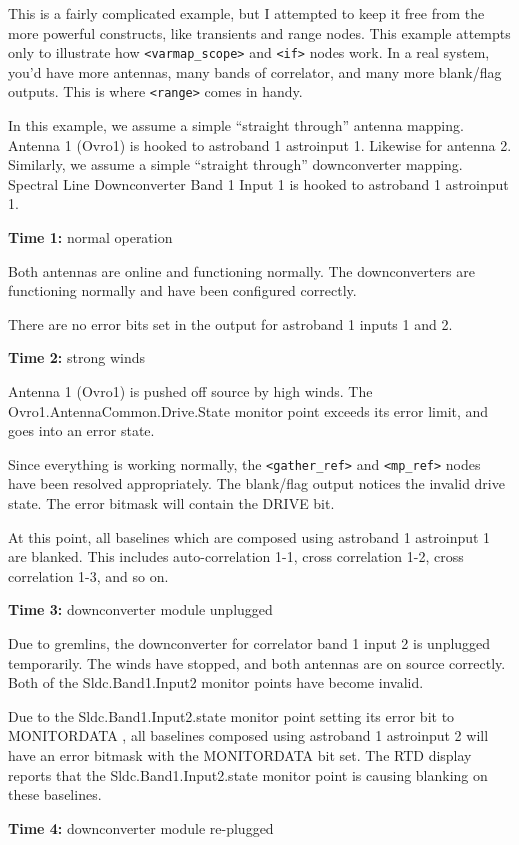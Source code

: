 \documentclass[letterpaper,12pt,oneside,pdftex]{article}
\newcommand{\mytime}[2]{\textbf{Time #1:} #2}
\begin{document}
This is a fairly complicated example, but I attempted to keep it free from the
more powerful constructs, like transients and range nodes. This example attempts
only to illustrate how \verb|<varmap_scope>| and \verb|<if>| nodes work. In a
real system, you'd have more antennas, many bands of correlator, and many more
blank/flag outputs. This is where \verb|<range>| comes in handy.

In this example, we assume a simple ``straight through'' antenna mapping.
Antenna 1 (Ovro1) is hooked to astroband 1 astroinput 1. Likewise for antenna 2.
Similarly, we assume a simple ``straight through'' downconverter mapping.
Spectral Line Downconverter Band 1 Input 1 is hooked to astroband 1 astroinput
1.

\mytime{1}{normal operation}

Both antennas are online and functioning normally. The downconverters are
functioning normally and have been configured correctly.

There are no error bits set in the output for astroband 1 inputs 1 and 2.

\mytime{2}{strong winds}

Antenna 1 (Ovro1) is pushed off source by high winds. The
Ovro1.AntennaCommon.Drive.State monitor point exceeds its error limit, and goes
into an error state.

Since everything is working normally, the \verb|<gather_ref>| and
\verb|<mp_ref>| nodes have been resolved appropriately. The blank/flag output
notices the invalid drive state. The error bitmask will contain the DRIVE bit.

At this point, all baselines which are composed using astroband 1 astroinput 1
are blanked. This includes auto-correlation 1-1, cross correlation 1-2, cross
correlation 1-3, and so on.

\mytime{3}{downconverter module unplugged}

Due to gremlins, the downconverter for correlator band 1 input 2 is unplugged
temporarily. The winds have stopped, and both antennas are on source correctly.
Both of the Sldc.Band1.Input2 monitor points have become invalid.

Due to the Sldc.Band1.Input2.state monitor point setting its error bit to
MONITORDATA , all baselines composed using astroband 1 astroinput 2 will have an
error bitmask with the MONITORDATA bit set. The RTD display reports that the
Sldc.Band1.Input2.state monitor point is causing blanking on these baselines.

\mytime{4}{downconverter module re-plugged}
\end{document}
